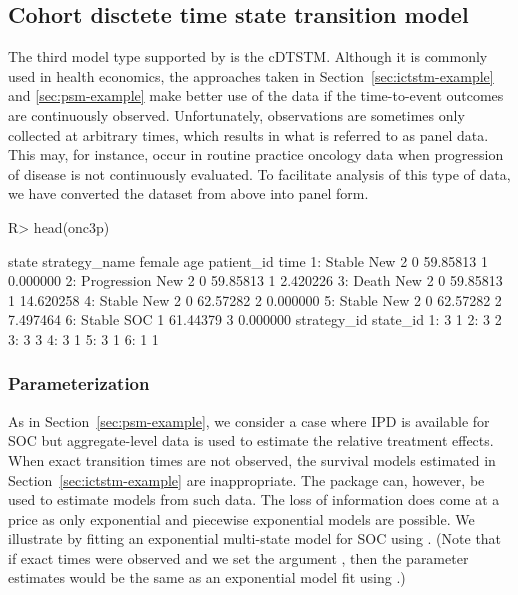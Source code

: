 \documentclass[article, nojss]{jss}\usepackage[]{graphicx}\usepackage[]{color}
\begin{document}
\subsection{Cohort disctete time state transition model} \label{sec:cdtstm-example}
The third model type supported by  is the cDTSTM. Although it is commonly used in health economics, the approaches taken in Section~\ref{sec:ictstm-example} and \ref{sec:psm-example} make better use of the data if the time-to-event outcomes are continuously observed. Unfortunately, observations are sometimes only collected at arbitrary times, which results in what is referred to as panel data. This may, for instance, occur in routine practice oncology data when progression of disease is not continuously evaluated. To facilitate analysis of this type of data, we have converted the  dataset from above into panel form. 

\begin{Schunk}
\begin{Sinput}
R> head(onc3p)
\end{Sinput}
\begin{Soutput}
         state strategy_name female      age patient_id      time
1:      Stable         New 2      0 59.85813          1  0.000000
2: Progression         New 2      0 59.85813          1  2.420226
3:       Death         New 2      0 59.85813          1 14.620258
4:      Stable         New 2      0 62.57282          2  0.000000
5:      Stable         New 2      0 62.57282          2  7.497464
6:      Stable           SOC      1 61.44379          3  0.000000
   strategy_id state_id
1:           3        1
2:           3        2
3:           3        3
4:           3        1
5:           3        1
6:           1        1
\end{Soutput}
\end{Schunk}

\subsubsection{Parameterization}
As in Section~\ref{sec:psm-example}, we consider a case where IPD is available for SOC but aggregate-level data is used to estimate the relative treatment effects. When exact transition times are not observed, the survival models estimated in Section~\ref{sec:ictstm-example} are inappropriate. The  package can, however, be used to estimate models from such data. The loss of information does come at a price as only exponential and piecewise exponential models are possible. We illustrate by fitting an exponential multi-state model for SOC using . (Note that if exact times were observed and we set the argument , then the parameter estimates would be the same as an exponential model fit using .)
\end{document}
